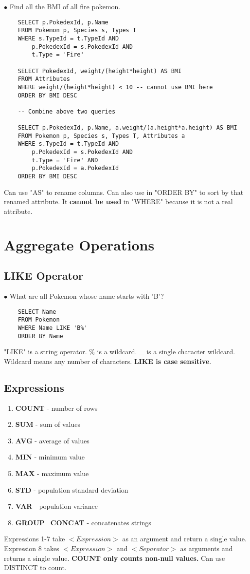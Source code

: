 \documentclass[twoside]{article}
\begin{document}
$\bullet$ Find all the BMI of all fire pokemon.
\begin{verbatim}
    SELECT p.PokedexId, p.Name
    FROM Pokemon p, Species s, Types T
    WHERE s.TypeId = t.TypeId AND
        p.PokedexId = s.PokedexId AND
        t.Type = 'Fire'

    SELECT PokedexId, weight/(height*height) AS BMI
    FROM Attributes
    WHERE weight/(height*height) < 10 -- cannot use BMI here
    ORDER BY BMI DESC

    -- Combine above two queries

    SELECT p.PokedexId, p.Name, a.weight/(a.height*a.height) AS BMI
    FROM Pokemon p, Species s, Types T, Attributes a
    WHERE s.TypeId = t.TypeId AND
        p.PokedexId = s.PokedexId AND
        t.Type = 'Fire' AND
        p.PokedexId = a.PokedexId
    ORDER BY BMI DESC
\end{verbatim}
Can use "AS" to rename columns. Can also use in "ORDER BY" to sort by that 
renamed attribute. It \textbf{cannot be used} in "WHERE" because it is not a 
real attribute.

\section*{Aggregate Operations}

\subsection*{LIKE Operator}

$\bullet$ What are all Pokemon whose name starts with 'B'?
\begin{verbatim}
    SELECT Name
    FROM Pokemon
    WHERE Name LIKE 'B%'
    ORDER BY Name
\end{verbatim}
"LIKE" is a string operator. \% is a wildcard. \_ is a single character 
wildcard. Wildcard means any number of characters. \textbf{LIKE is case 
sensitive}.

\subsection*{Expressions}
\begin{enumerate}
    \item \textbf{COUNT} - number of rows
    \item \textbf{SUM} - sum of values
    \item \textbf{AVG} - average of values
    \item \textbf{MIN} - minimum value
    \item \textbf{MAX} - maximum value
    \item \textbf{STD} - population standard deviation
    \item \textbf{VAR} - population variance
    \item \textbf{GROUP\_CONCAT} - concatenates strings
\end{enumerate}
Expressions 1-7 take $<Expression>$ as an argument and return a single value.
Expression 8 takes $<Expression>$ and $<Separator>$ as arguments and returns a
single value. \textbf{COUNT only counts non-null values.} Can use DISTINCT to 
count.
\end{document}
